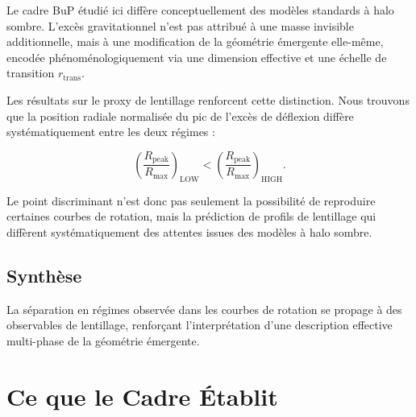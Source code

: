 \documentclass[11pt]{article}
\begin{document}
Le cadre BuP étudié ici diffère conceptuellement des modèles standards à halo sombre. L'excès gravitationnel n'est pas attribué à une masse invisible additionnelle, mais à une modification de la géométrie émergente elle-même, encodée phénoménologiquement via une dimension effective et une échelle de transition $r_{\mathrm{trans}}$.

Les résultats sur le proxy de lentillage renforcent cette distinction. Nous trouvons que la position radiale normalisée du pic de l'excès de déflexion diffère systématiquement entre les deux régimes :

\[
\left(\frac{R_{\mathrm{peak}}}{R_{\max}}\right)_{\mathrm{LOW}}
<
\left(\frac{R_{\mathrm{peak}}}{R_{\max}}\right)_{\mathrm{HIGH}}.
\]

Le point discriminant n'est donc pas seulement la possibilité de reproduire certaines courbes de rotation, mais la prédiction de profils de lentillage qui diffèrent systématiquement des attentes issues des modèles à halo sombre.

\subsection{Synthèse}

La séparation en régimes observée dans les courbes de rotation se propage à des observables de lentillage, renforçant l'interprétation d'une description effective multi-phase de la géométrie émergente.


\section{Ce que le Cadre Établit}
\end{document}
